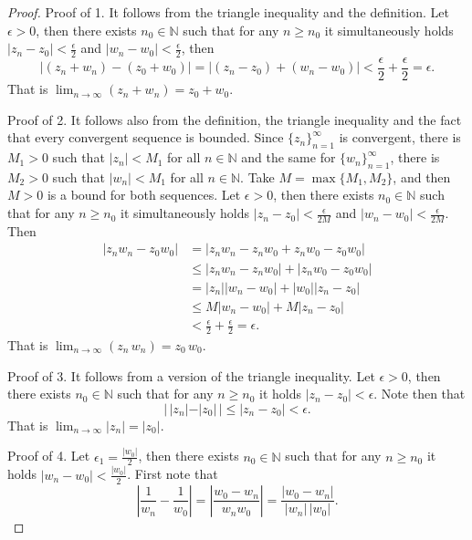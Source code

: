 \documentclass{amsart}
\begin{document}
\begin{proof}
Proof of 1. It follows from the triangle inequality and the definition. Let \(\epsilon > 0\), then there exists \(n_0 \in \mathbb{N}\) such that for any \(n\geq n_0\) it simultaneously holds \(|z_n - z_0| < \frac{\epsilon}{2}\) and \(|w_n - w_0| < \frac{\epsilon}{2}\), then 
\[ |(z_n + w_n) - (z_0 + w_0) | = |(z_n - z_0) + (w_n - w_0) | < \frac{\epsilon}{2} + \frac{\epsilon}{2} = \epsilon. \]
That is \(\displaystyle\lim_{n\to\infty}(z_n + w_n) = z_0 + w_0\).

Proof of 2. It follows also from the definition, the triangle inequality and the fact that every convergent sequence is bounded. Since \(\{z_n\}_{n=1}^{\infty}\) is convergent, there is \(M_1>0\) such that \(|z_n| < M_1\) for all \(n\in\mathbb{N}\) and the same for \(\{w_n\}_{n=1}^{\infty}\), there is \(M_2 >0\) such that \(|w_n| < M_1\) for all \(n\in\mathbb{N}\). Take \(M = \max\{M_1,M_2\}\), and then \(M>0\) is a bound for both sequences.  Let \(\epsilon > 0\), then there exists \(n_0 \in \mathbb{N}\) such that for any \(n\geq n_0\) it simultaneously holds \(|z_n - z_0| < \frac{\epsilon}{2M}\) and \(|w_n - w_0| <  \frac{\epsilon}{2M}\). Then 
\begin{equation*} \begin{split} |z_n w_n - z_0 w_0 | &= | z_n w_n - z_n w_0 + z_n w_0 - z_0 w_0 | \\ & \leq | z_n w_n - z_n w_0 | + |z_n w_0 - z_0 w_0 | \\ &  = |z_n| | w_n - w_0| + |w_0| |z_n - z_0|  \\ & \leq M | w_n - w_0| + M |z_n - z_0| \\ & < \frac{\epsilon}{2} +  \frac{\epsilon}{2} = \epsilon. \end{split} \end{equation*}
That is \(\displaystyle\lim_{n\to\infty}(z_n \, w_n) = z_0 \, w_0\).

Proof of 3. It follows from a version of the triangle inequality. Let \(\epsilon > 0\), then there exists \(n_0 \in \mathbb{N}\) such that for any \(n\geq n_0\) it holds \(|z_n - z_0| < \epsilon\). Note then that
\[ |\, |z_n| - |z_0| \, | \leq |z_n - z_0| < \epsilon. \]
That is \(\displaystyle\lim_{n\to\infty}|z_n| = |z_0|\).

Proof of 4. Let \(\epsilon_1 = \frac{|w_0|}{2}\), then there exists \(n_0 \in \mathbb{N}\) such that for any \(n\geq n_0\) it holds \(|w_n - w_0| < \frac{|w_0|}{2}\). First note that
\[ \left| \frac{1}{w_n} - \frac{1}{w_0} \right| = |\frac{ w_0 - w_n}{w_n w_0} | = \frac{ |w_0 - w_n|}{|w_n |\, |w_0|}. \]


\end{proof}
\end{document}
